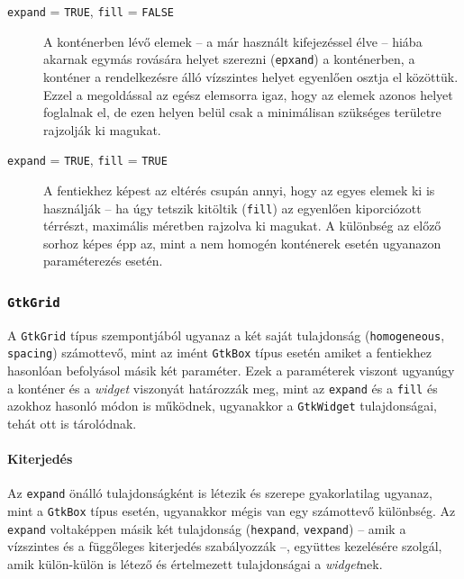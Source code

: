 \begin{description}
 \item[\texttt{expand} = \texttt{TRUE}, \texttt{fill} = \texttt{FALSE}] A konténerben lévő elemek -- a már használt kifejezéssel élve -- hiába akarnak egymás rovására helyet szerezni (\texttt{epxand}) a konténerben, a konténer a rendelkezésre álló vízszintes helyet egyenlően osztja el közöttük. Ezzel a megoldással az egész elemsorra igaz, hogy az elemek azonos helyet foglalnak el, de ezen helyen belül csak a minimálisan szükséges területre rajzolják ki magukat.

 \item[\texttt{expand} = \texttt{TRUE}, \texttt{fill} = \texttt{TRUE}] A fentiekhez képest az eltérés csupán annyi, hogy az egyes elemek ki is használják -- ha úgy tetszik kitöltik (\texttt{fill}) az egyenlően kiporciózott térrészt, maximális méretben rajzolva ki magukat. A különbség az előző sorhoz képes épp az, mint a nem homogén konténerek esetén ugyanazon paraméterezés esetén.
\end{description}

\subsubsection{\texttt{GtkGrid}}

A \texttt{GtkGrid} típus szempontjából ugyanaz a két saját tulajdonság (\texttt{homogeneous}, \texttt{spacing}) számottevő, mint az imént \texttt{GtkBox} típus esetén amiket a fentiekhez hasonlóan befolyásol másik két paraméter. Ezek a paraméterek viszont ugyanúgy a konténer és a \textit{widget} viszonyát határozzák meg, mint az \texttt{expand} és a \texttt{fill} és azokhoz hasonló módon is működnek, ugyanakkor a \texttt{GtkWidget} tulajdonságai, tehát ott is tárolódnak.

\paragraph{Kiterjedés}

Az \texttt{expand} önálló tulajdonságként is létezik és szerepe gyakorlatilag ugyanaz, mint a \texttt{GtkBox} típus esetén, ugyanakkor mégis van egy számottevő különbség. Az \texttt{expand} voltaképpen másik két tulajdonság (\texttt{hexpand}, \texttt{vexpand}) -- amik a vízszintes és a függőleges kiterjedés szabályozzák --, együttes kezelésére szolgál, amik külön-külön is létező és értelmezett tulajdonságai a \textit{widget}nek.

